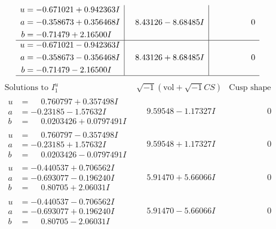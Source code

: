 \documentclass[1p]{elsarticle_modified}
\theoremstyle{definition}
\newcommand{\I}{\sqrt{-1}}
\begin{document}
$$\begin{array}{c|c|c}
\begin{aligned}
u &= -0.671021 + 0.942363 I \\
a &= -0.358673 + 0.356468 I \\
b &= -0.71479 + 2.16500 I\end{aligned}
 & \phantom{-}8.43126 - 8.68485 I & \phantom{-0.000000 } 0 \\ \hline\begin{aligned}
u &= -0.671021 - 0.942363 I \\
a &= -0.358673 - 0.356468 I \\
b &= -0.71479 - 2.16500 I\end{aligned}
 & \phantom{-}8.43126 + 8.68485 I & \phantom{-0.000000 } 0\\
 \hline 
 \end{array}$$\newpage$$\begin{array}{c|c|c}  
\text{Solutions to }I^u_{1}& \I (\text{vol} + \sqrt{-1}CS) & \text{Cusp shape}\\
 \hline 
\begin{aligned}
u &= \phantom{-}0.760797 + 0.357498 I \\
a &= -0.23185 - 1.57632 I \\
b &= \phantom{-}0.0203426 + 0.0797491 I\end{aligned}
 & \phantom{-}9.59548 - 1.17327 I & \phantom{-0.000000 } 0 \\ \hline\begin{aligned}
u &= \phantom{-}0.760797 - 0.357498 I \\
a &= -0.23185 + 1.57632 I \\
b &= \phantom{-}0.0203426 - 0.0797491 I\end{aligned}
 & \phantom{-}9.59548 + 1.17327 I & \phantom{-0.000000 } 0 \\ \hline\begin{aligned}
u &= -0.440537 + 0.706562 I \\
a &= -0.693077 - 0.196240 I \\
b &= \phantom{-}0.80705 + 2.06031 I\end{aligned}
 & \phantom{-}5.91470 + 5.66066 I & \phantom{-0.000000 } 0 \\ \hline\begin{aligned}
u &= -0.440537 - 0.706562 I \\
a &= -0.693077 + 0.196240 I \\
b &= \phantom{-}0.80705 - 2.06031 I\end{aligned}
 & \phantom{-}5.91470 - 5.66066 I & \phantom{-0.000000 } 0 \\ \hline\begin{aligned}

\end{aligned}
\end{array}$$
\end{document}
